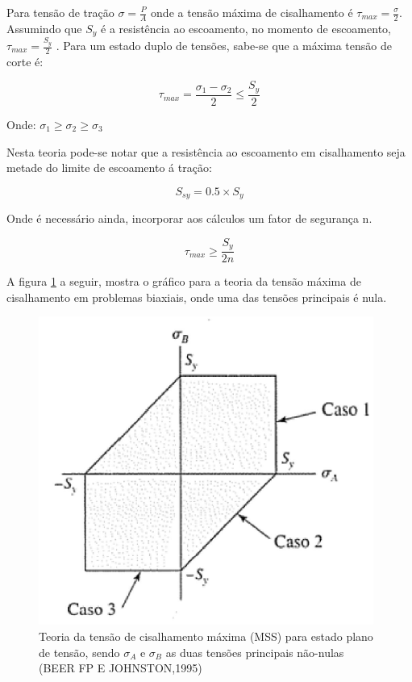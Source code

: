 Para tensão de tração $\sigma = \frac{P}{A}$ onde a tensão máxima de cisalhamento é $\tau _{max} = \frac{\sigma}{2}$. Assumindo que $S_y$ é a resistência ao escoamento, no momento de escoamento, $\tau _{max} = \frac{S_{y}}{2}$ . Para um estado duplo de tensões, sabe-se que a máxima tensão de corte é:

\begin{equation}
\tau _{max} = \frac{\sigma_{1} - \sigma_{2}}{2}\leq \frac{S_{y}}{2}
\end{equation}

Onde: $\sigma_{1} \geq  \sigma_{2} \geq  \sigma_{3}$

Nesta teoria pode-se notar que a resistência ao escoamento em cisalhamento seja metade do limite de escoamento á tração:

\begin{equation}
S_{sy} = 0.5\times S_{y}
\end{equation}

Onde é necessário ainda, incorporar aos cálculos um fator de segurança n.

\begin{equation}
\tau_{max} \geq \frac{S_{y}}{2n}
\end{equation}

A figura \ref{teoria-tensao} a seguir, mostra o gráfico para a teoria da tensão máxima de cisalhamento em problemas biaxiais, onde uma das tensões principais é nula.

\begin{figure}[h]
\centering
\includegraphics[scale=0.7]{figuras/tensao_cisa.png}
\caption{Teoria da tensão de cisalhamento máxima (MSS) para estado plano de tensão, sendo $\sigma_{A}$ e $\sigma_{B}$ as duas tensões principais não-nulas (BEER FP E  JOHNSTON,1995)}
\label{teoria-tensao}
\end{figure}

